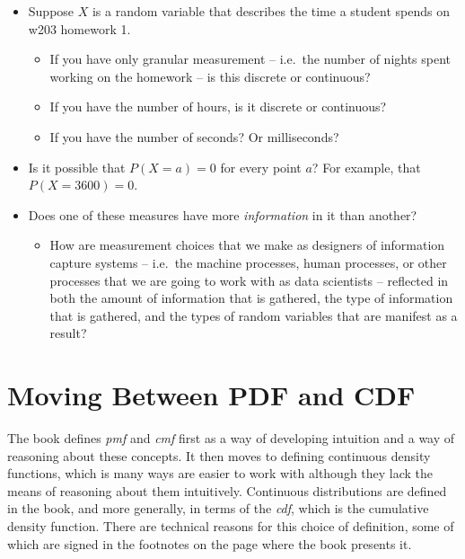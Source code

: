 \documentclass[
]{book}
\providecommand{\tightlist}{%
  \setlength{\itemsep}{0pt}\setlength{\parskip}{0pt}}
\theoremstyle{definition}
\theoremstyle{definition}
\theoremstyle{definition}
\theoremstyle{definition}
\theoremstyle{remark}
\begin{document}
\begin{itemize}
\tightlist
\item
  Suppose \(X\) is a random variable that describes the time a student spends on w203 homework 1.

  \begin{itemize}
  \tightlist
  \item
    If you have only granular measurement -- i.e.~the number of nights spent working on the homework -- is this discrete or continuous?
  \item
    If you have the number of hours, is it discrete or continuous?
  \item
    If you have the number of seconds? Or milliseconds?
  \end{itemize}
\item
  Is it possible that \(P(X = a) = 0\) for every point \(a\)? For example, that \(P(X = 3600) = 0\).
\item
  Does one of these measures have more \emph{information} in it than another?

  \begin{itemize}
  \tightlist
  \item
    How are measurement choices that we make as designers of information capture systems -- i.e.~the machine processes, human processes, or other processes that we are going to work with as data scientists -- reflected in both the amount of information that is gathered, the type of information that is gathered, and the types of random variables that are manifest as a result?
  \end{itemize}
\end{itemize}

\hypertarget{moving-between-pdf-and-cdf}{%
\section{Moving Between PDF and CDF}\label{moving-between-pdf-and-cdf}}

The book defines \emph{pmf} and \emph{cmf} first as a way of developing intuition and a way of reasoning about these concepts. It then moves to defining continuous density functions, which is many ways are easier to work with although they lack the means of reasoning about them intuitively. Continuous distributions are defined in the book, and more generally, in terms of the \emph{cdf}, which is the cumulative density function. There are technical reasons for this choice of definition, some of which are signed in the footnotes on the page where the book presents it.
\end{document}
